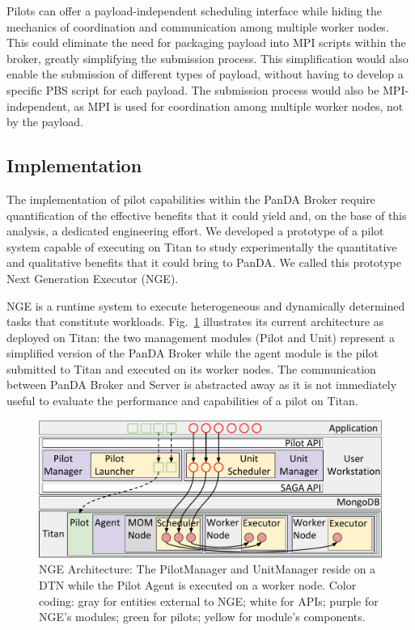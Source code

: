 Pilots can offer a payload-independent scheduling interface while hiding the
mechanics of coordination and communication among multiple worker nodes. This
could eliminate the need for packaging payload into MPI scripts within the
broker, greatly simplifying the submission process. This simplification would
also enable the submission of different types of payload, without having to
develop a specific PBS script for each payload. The submission process would
also be MPI-independent, as MPI is used for coordination among multiple
worker nodes, not by the payload.

\subsection{Implementation}
\label{sec:arch}

The implementation of pilot capabilities within the PanDA Broker require
quantification of the effective benefits that it could yield and, on the base
of this analysis, a dedicated engineering effort. We developed a prototype of
a pilot system capable of executing on Titan to study experimentally the
quantitative and qualitative benefits that it could bring to PanDA\@. We
called this prototype Next Generation Executor (NGE).

NGE is a runtime system to execute heterogeneous and dynamically determined
tasks that constitute workloads. Fig.~\ref{fig:arch-overview} illustrates its
current architecture as deployed on Titan: the two management modules (Pilot
and Unit) represent a simplified version of the PanDA Broker while the agent
module is the pilot submitted to Titan and executed on its worker nodes. The
communication between PanDA Broker and Server is abstracted away as it is not
immediately useful to evaluate the performance and capabilities of a pilot on
Titan.

\begin{figure}
  \centering
	\includegraphics[width=\columnwidth]{figures/rp_architecture_compact_atlaswms_paper.pdf}
	\vspace{-0.3in}
	\caption{NGE Architecture: The PilotManager and UnitManager reside on a
  	DTN while the Pilot Agent is executed on a worker node. Color coding:
  	gray for entities external to NGE\@; white for APIs; purple for NGE's
  	modules; green for pilots; yellow for module's components.}
\label{fig:arch-overview}
\end{figure}

